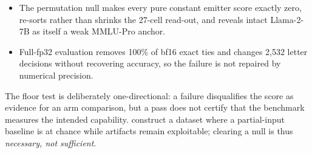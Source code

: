 \begin{itemize}[leftmargin=*,nosep]
    \item The permutation null makes every pure constant emitter score exactly zero, re-sorts rather than shrinks the 27-cell read-out, and reveals intact Llama-2-7B as itself a weak MMLU-Pro anchor.
    \item Full-fp32 evaluation removes 100\% of bf16 exact ties and changes 2,532 letter decisions without recovering accuracy, so the failure is not repaired by numerical precision.
\end{itemize}

The floor test is deliberately one-directional: a failure disqualifies the score as evidence for an arm comparison, but a pass does not certify that the benchmark measures the intended capability. \citet{feng2019misleading} construct a dataset where a partial-input baseline is at chance while artifacts remain exploitable; clearing a null is thus \emph{necessary, not sufficient}.
